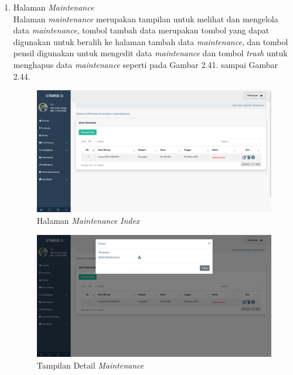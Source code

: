 \begin{enumerate}
  \item Halaman \textit{Maintenance} \\ Halaman \textit{maintenance} merupakan tampilan untuk melihat dan mengelola data \textit{maintenance}, tombol tambah data merupakan tombol yang dapat digunakan untuk beralih ke halaman tambah data \textit{maintenance}, dan tombol pensil digunakan untuk mengedit data \textit{maintenance} dan tombol \textit{trash} untuk menghapus data \textit{maintenance} seperti pada Gambar 2.41. sampai Gambar 2.44.
        \begin{figure}
          \centering
          \includegraphics[width=0.82\linewidth]{konten//gambar/maintenance index.png}
          \caption{Halaman \textit{Maintenance} \textit{Index}}
          \label{fig:enter-label}
        \end{figure}

        \begin{figure}
          \centering
          \includegraphics[width=0.82\linewidth]{konten//gambar/maintenance detail.png}
          \caption{Tampilan Detail \textit{Maintenance}}
          \label{fig:enter-label}
        \end{figure}


\end{enumerate}
